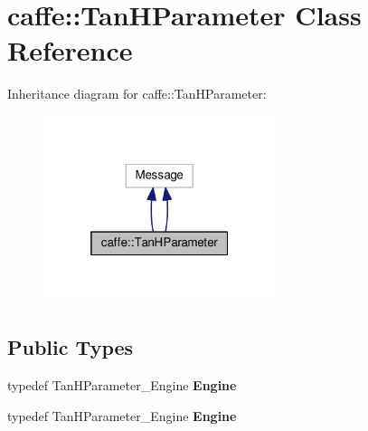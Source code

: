 \hypertarget{classcaffe_1_1_tan_h_parameter}{}\section{caffe\+:\+:Tan\+H\+Parameter Class Reference}
\label{classcaffe_1_1_tan_h_parameter}


Inheritance diagram for caffe\+:\+:Tan\+H\+Parameter\+:
\nopagebreak
\begin{figure}[H]
\begin{center}
\leavevmode
\includegraphics[width=193pt]{classcaffe_1_1_tan_h_parameter__inherit__graph}
\end{center}
\end{figure}
\subsection*{Public Types}
\begin{DoxyCompactItemize}
\item 
\mbox{\label{classcaffe_1_1_tan_h_parameter_a8bdae7b6b1f63124068ffc017e21cbd7}} 
typedef Tan\+H\+Parameter\+\_\+\+Engine {\bfseries Engine}
\item 
\mbox{\label{classcaffe_1_1_tan_h_parameter_a8bdae7b6b1f63124068ffc017e21cbd7}} 
typedef Tan\+H\+Parameter\+\_\+\+Engine {\bfseries Engine}
\end{DoxyCompactItemize}
